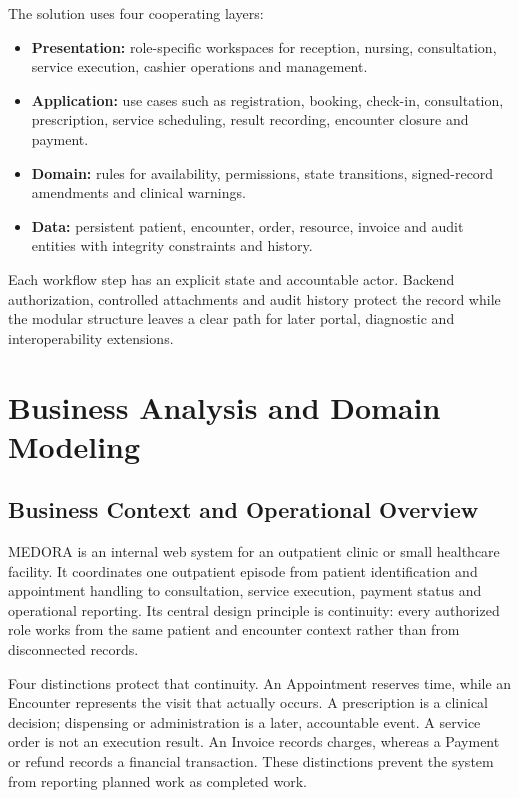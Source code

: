 \documentclass[a4paper,12pt]{article}
\begin{document}
The solution uses four cooperating layers:

\begin{itemize}[leftmargin=1.4em]
    \item \textbf{Presentation:} role-specific workspaces for reception, nursing, consultation, service execution, cashier operations and management.
    \item \textbf{Application:} use cases such as registration, booking, check-in, consultation, prescription, service scheduling, result recording, encounter closure and payment.
    \item \textbf{Domain:} rules for availability, permissions, state transitions, signed-record amendments and clinical warnings.
    \item \textbf{Data:} persistent patient, encounter, order, resource, invoice and audit entities with integrity constraints and history.
\end{itemize}

Each workflow step has an explicit state and accountable actor. Backend authorization, controlled attachments and audit history protect the record while the modular structure leaves a clear path for later portal, diagnostic and interoperability extensions.

\section{Business Analysis and Domain Modeling}

\subsection{Business Context and Operational Overview}
MEDORA is an internal web system for an outpatient clinic or small healthcare facility. It coordinates one outpatient episode from patient identification and appointment handling to consultation, service execution, payment status and operational reporting. Its central design principle is continuity: every authorized role works from the same patient and encounter context rather than from disconnected records.

Four distinctions protect that continuity. An Appointment reserves time, while an Encounter represents the visit that actually occurs. A prescription is a clinical decision; dispensing or administration is a later, accountable event. A service order is not an execution result. An Invoice records charges, whereas a Payment or refund records a financial transaction. These distinctions prevent the system from reporting planned work as completed work.
\end{document}
